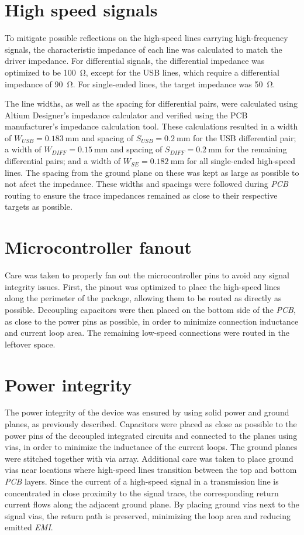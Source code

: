 \section{High speed signals}
To mitigate possible reflections on the high-speed lines carrying high-frequency signals, the characteristic impedance of each line was calculated to match the driver impedance. For differential signals, the differential impedance was optimized to be \SI{100}{\ohm}, except for the USB lines, which require a differential impedance of \SI{90}{\ohm}. For single-ended lines, the target impedance was \SI{50}{\ohm}.

The line widths, as well as the spacing for differential pairs, were calculated using Altium Designer’s impedance calculator and verified using the PCB manufacturer’s impedance calculation tool. These calculations resulted in a width of $W_{USB} = \SI{0.183}{\milli\meter}$ and spacing of $S_{USB} = \SI{0.2}{\milli\meter}$ for the USB differential pair; a width of $W_{DIFF} = \SI{0.15}{\milli\meter}$ and spacing of $S_{DIFF} = \SI{0.2}{\milli\meter}$ for the remaining differential pairs; and a width of $W_{SE} = \SI{0.182}{\milli\meter}$ for all single-ended high-speed lines. The spacing from the ground plane on these was kept as large as possible to not afect the impedance. These widths and spacings were followed during \emph{PCB} routing to ensure the trace impedances remained as close to their respective targets as possible.

\section{Microcontroller fanout}
Care was taken to properly fan out the microcontroller pins to avoid any signal integrity issues. First, the pinout was optimized to place the high-speed lines along the perimeter of the package, allowing them to be routed as directly as possible. Decoupling capacitors were then placed on the bottom side of the \emph{PCB}, as close to the power pins as possible, in order to minimize connection inductance and current loop area. The remaining low-speed connections were routed in the leftover space.

\section{Power integrity}
The power integrity of the device was ensured by using solid power and ground planes, as previously described. Capacitors were placed as close as possible to the power pins of the decoupled integrated circuits and connected to the planes using vias, in order to minimize the inductance of the current loops. The ground planes were stitched together with via array. Additional care was taken to place ground vias near locations where high-speed lines transition between the top and bottom \emph{PCB} layers. Since the current of a high-speed signal in a transmission line is concentrated in close proximity to the signal trace, the corresponding return current flows along the adjacent ground plane. By placing ground vias next to the signal vias, the return path is preserved, minimizing the loop area and reducing emitted \emph{EMI}.

